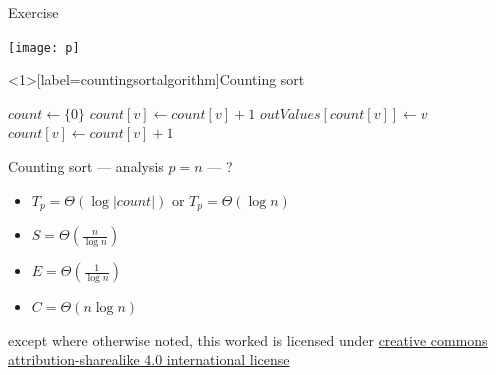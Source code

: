 \documentclass[10pt, t]{beamer}
\begin{document}
  \begin{frame}{Exercise}
    \vspace{-6ex}
    \begin{center}
      \texttt{[image: p]}
    \end{center}
  \end{frame}

  \begin{frame}<1>[label=countingsortalgorithm]{Counting sort}
    \begin{algorithmic}[1]
        \State $count\gets \{0\}$
          \State $count[v]\gets count[v]+1$
        \EndFor
        \State{}
          \State $outValues[count[v]]\gets v$
          \State $count[v]\gets count[v]+1$
        \EndFor
      \EndFunction
    \end{algorithmic}
  \end{frame}

  \begin{frame}{Counting sort --- analysis}
    $p=n$ --- ?
    \begin{itemize}
      \item $T_p=\Theta(\log |count|)$ or $T_p=\Theta(\log n)$
      \item $S=\Theta(\frac{n}{\log n})$
      \item $E=\Theta(\frac{1}{\log n})$
      \item $C=\Theta(n\log n)$
    \end{itemize}
  \end{frame}



  \appendix

  \begin{frame}[c]
    \begin{center}\ccbysa\end{center}

    except where otherwise noted, this worked is licensed under
    \href{http://creativecommons.org/licenses/by-sa/4.0/}{creative commons
    attribution-sharealike 4.0 international license}
  \end{frame}
\end{document}

